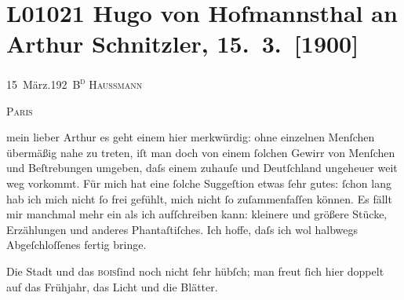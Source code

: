 

\section[Hugo von Hofmannsthal an Arthur Schnitzler, 15. 3. {[}1900{]}]{L01021 Hugo von Hofmannsthal an Arthur Schnitzler, 15. 3. {[}1900{]}}
\nopagebreak{}
\rehead{ }\normalsize\beginnumbering{}
\toendnotes[C]{\smallbreak\pagebreak[2]}
\toendnotes[C]{\smallbreak}
\pstart
           {\pb}15 März.\hfill \textsc{192 B\textsuperscript{d}
                           Haussmann}\pend
           
\pstart
           \raggedleft{}\textsc{Paris}\pend
           
\pstart{}mein lieber Arthur\pend\vspace{0.5em}
\pstart
           es geht einem hier merkwürdig: ohne einzelnen Menſchen übermäßig nahe zu treten, iſt
               man doch von einem ſolchen Gewirr von Menſchen und Beſtrebungen umgeben, daſs einem
               zuhauſe und Deutſchland ungeheuer weit weg
               vorkommt. Für mich hat eine ſolche Suggeſtion etwas ſehr gutes: ſchon lang hab ich
               mich nicht ſo frei gefühlt, mich {\pb}nicht ſo zuſammenfaſſen können. Es fällt mir manchmal mehr ein als ich aufſchreiben
               kann: kleinere und größere Stücke, Erzählungen und anderes Phantaſtiſches. Ich hoffe,
               daſs ich wol halbwegs Abgeſchloſſenes fertig bringe.\pend
           
\pstart
           Die Stadt und das \textsc{bois}ſind noch nicht ſehr hübſch; man freut ſich hier
               doppelt auf das Frühjahr, das Licht und die Blätter.\pend
           
